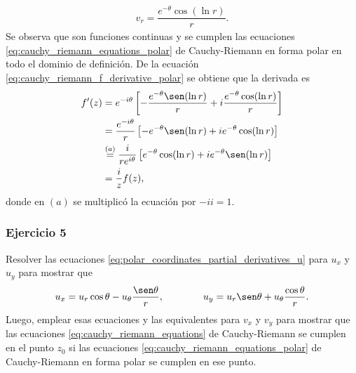 \documentclass[a4paper]{report}
\begin{document}
\begin{enumerate}
\[\begin{array}{ll}
  v_r=\dfrac{e^{-\theta}\cos(\ln r)}{r}.
 \end{array}
 \]
 Se observa que son funciones continuas y se cumplen las ecuaciones \ref{eq:cauchy_riemann_equations_polar} de Cauchy-Riemann en forma polar en todo el dominio de definición. De la ecuación \ref{eq:cauchy_riemann_f_derivative_polar} se obtiene que la derivada es
 \begin{align*}
  f'(z)&=e^{-i\theta}\left[-\frac{e^{-\theta}\sen(\ln r)}{r}+i\frac{e^{-\theta}\cos(\ln r)}{r}\right]\\
  &=\frac{e^{-i\theta}}{r}\left[-e^{-\theta}\sen(\ln r)+ie^{-\theta}\cos(\ln r)\right]\\
  &\overset{(a)}{=}\frac{i}{re^{i\theta}}\left[e^{-\theta}\cos(\ln r)+ie^{-\theta}\sen(\ln r)\right]\\
  &=\frac{i}{z}f(z),
 \end{align*}
 donde en \((a)\) se multiplicó la ecuación por \(-ii=1\).
\end{enumerate}

\subsubsection{Ejercicio 5}

Resolver las ecuaciones \ref{eq:polar_coordinates_partial_derivatives_u} para \(u_x\) y \(u_y\) para mostrar que 
\begin{equation}\label{eq:polar_coordinates_partial_derivatives_u_inverse}
 u_x=u_r\cos\theta-u_\theta\frac{\sen\theta}{r},
 \qquad\qquad
 u_y=u_r\sen\theta+u_\theta\frac{\cos\theta}{r}.
\end{equation}
Luego, emplear esas ecuaciones y las equivalentes para \(v_x\) y \(v_y\) para mostrar que las ecuaciones \ref{eq:cauchy_riemann_equations} de Cauchy-Riemann se cumplen en el punto \(z_0\) si las ecuaciones \ref{eq:cauchy_riemann_equations_polar} de Cauchy-Riemann en forma polar se cumplen en ese punto.
\end{document}
